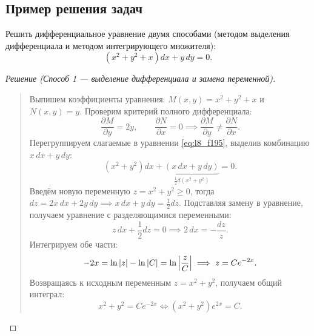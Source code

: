 \subsection{Пример решения задач}

\begin{problem}[Ф.195]
    Решить дифференциальное уравнение двумя способами (методом выделения
    дифференциала и методом интегрирующего множителя):
    \begin{equation} \label{eq:l8_f195}
        \left(x^2 + y^2 + x\right) dx + y \, dy = 0. \tag{17}
    \end{equation}
\end{problem}

\begin{proof}[Решение (Способ 1 — выделение дифференциала и замена переменной)]~\\
    \begin{quote}
        Выпишем коэффициенты уравнения: $M(x, y) = x^2 + y^2 + x$ и
        $N(x, y) = y$. Проверим критерий полного дифференциала:
        \[
            \frac{\partial M}{\partial y} = 2y, \qquad
            \frac{\partial N}{\partial x} = 0 \implies
            \frac{\partial M}{\partial y} \neq \frac{\partial N}{\partial x}.
        \]
        Перегруппируем слагаемые в уравнении \eqref{eq:l8_f195}, выделив
        комбинацию $x \, dx + y \, dy$:
        \[
            \left(x^2 + y^2\right) dx +
            \underbrace{\left(x \, dx + y \, dy\right)}_{\frac{1}{2} d(x^2 + y^2)}
            = 0.
        \]
        Введём новую переменную $z = x^2 + y^2 \ge 0$, тогда
        $dz = 2x \, dx + 2y \, dy \implies x \, dx + y \, dy = \frac{1}{2} dz$.
        Подставляя замену в уравнение, получаем уравнение с разделяющимися
        переменными:
        \[
            z \, dx + \frac{1}{2} dz = 0 \implies 2 \, dx = -\frac{dz}{z}.
        \]
        Интегрируем обе части:
        \[
            -2x = \ln \left| z \right| - \ln \left| C \right| = \ln \left| \frac{z}{C} \right| \implies
            z = C e^{-2x}.
        \]
        Возвращаясь к исходным переменным $z = x^2 + y^2$, получаем общий
        интеграл:
        \[
            x^2 + y^2 = C e^{-2x} \iff \left(x^2 + y^2\right) e^{2x} = C.
        \]
    \end{quote}
\end{proof}

